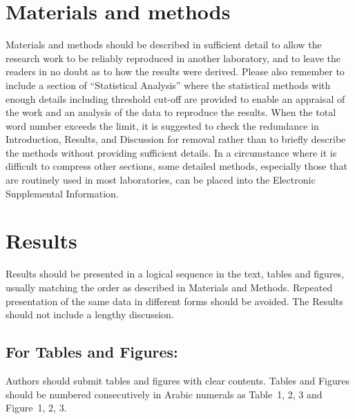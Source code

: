 \documentclass[12pt,a4paper]{article}
\begin{document}
\section{Materials and methods}
Materials and methods should be described in sufficient detail to allow the research work to be reliably reproduced in another laboratory, and to leave the readers in no doubt as to how the results were derived. Please also remember to include a section of “Statistical Analysis” where the statistical methods with enough details including threshold cut-off are provided to enable an appraisal of the work and an analysis of the data to reproduce the results. When the total word number exceeds the limit, it is suggested to check the redundance in Introduction, Results, and Discussion for removal rather than to briefly describe the methods without providing sufficient details. In a circumstance where it is difficult to compress other sections, some detailed methods, especially those that are routinely used in most laboratories, can be placed into the Electronic Supplemental Information.
\section{Results}

Results should be presented in a logical sequence in the text, tables and figures, usually matching the order as described in Materials and Methods. Repeated presentation of the same data in different forms should be avoided. The Results should not include a lengthy discussion.

\subsection*{For Tables and Figures:}

Authors should submit tables and figures with clear contents. Tables and Figures should be numbered consecutively in Arabic numerals as Table~1, 2, 3 and Figure~1, 2, 3.
\end{document}
